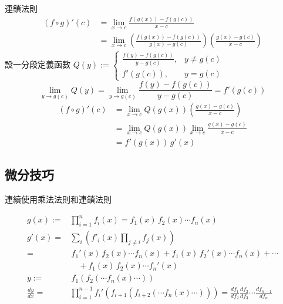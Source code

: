 \documentclass{beamer}
\begin{document}
\begin{CJK}{UTF8}{bsmi}
\begin{frame}[allowframebreaks]{連鎖法則}
  \begin{align*}
    (f \circ g)'(c) &= \lim_{x \to c} \frac{f(g(x)) - f(g(c))}{x-c}\\
      &= \lim_{x \to c} \left( \frac{f(g(x)) - f(g(c))}{g(x) - g(c)} \right) \left( \frac{g(x) - g(c)}{x-c} \right)
  \end{align*}
  設一分段定義函數 $\displaystyle Q(y) :=
    \begin{cases}
      \frac{f(y) - f(g(c))}{y - g(c)}, & y \ne g(c)\\
      f'(g(c)),                        & y = g(c)
    \end{cases}$
  \[\lim_{y \to g(c)} Q(y) = \lim_{y \to g(c)} \frac{f(y) - f(g(c))}{y - g(c)} = f'(g(c))\]
  \begin{align*}
    (f \circ g)'(c) &= \lim_{x \to c} Q(g(x)) \left( \frac{g(x) - g(c)}{x-c} \right)\\
      &= \lim_{x \to c} Q(g(x)) \lim_{x \to c} \frac{g(x) - g(c)}{x-c}\\
      &= f'(g(x))\,g'(x)
  \end{align*}
\end{frame}

\subsection{微分技巧}
\begin{frame}{連續使用乘法法則和連鎖法則}
  \begin{theorem}
    \begin{align*}
      g(x) :=& \prod_{i=1}^n f_i(x) = f_1(x)\,f_2(x) \cdots f_n(x)\\
      g'(x) =& \sum_i \left( f'_i(x) \prod_{j\ne i} f_j(x) \right)\\
	    =&\, f_1'(x)\,f_2(x) \cdots f_n(x) + f_1(x)\,f_2'(x) \cdots f_n(x) + \cdots\\
	     &\quad + f_1(x)\,f_2(x) \cdots f_n'(x)\\
      y :=&\, f_1(f_2(\cdots f_n(x) \cdots))\\
      \frac{dy}{dx} =& \prod_{i=1}^{n-1} f_i'(f_{i+1}(f_{i+2}(\cdots f_n(x) \cdots)))
	= \frac{df_1}{df_2} \frac{df_2}{df_3} \cdots \frac{df_{n-1}}{df_n}
    \end{align*}
  \end{theorem}
\end{frame}


\end{CJK}
\end{document}

